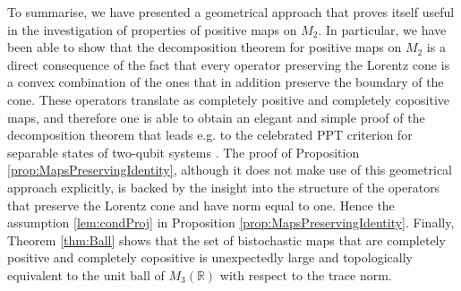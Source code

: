 \documentclass[12pt]{article}
\theoremstyle{plain}
\theoremstyle{definition}
\theoremstyle{remark}
\numberwithin{equation}{section}
\begin{document}
To summarise, we have presented a geometrical approach that proves itself useful
in the investigation of properties of positive maps on $M_{2}$.
In particular, we have been able to show that the decomposition theorem for
positive maps on $M_{2}$ is a direct consequence of the fact that every operator
preserving the Lorentz cone is a convex combination of the ones that
in addition preserve the boundary of the cone.
These operators translate as completely positive and completely copositive maps,
and therefore one is able to obtain an elegant and simple proof of the decomposition
theorem that leads e.g. to the celebrated PPT criterion for separable states
of two-qubit systems \cite{peres1996separability,horodecki1996separability}.
The proof of Proposition \ref{prop:MapsPreservingIdentity},
although it does not make use of this geometrical approach explicitly,
is backed by the insight into the structure of the operators that preserve the
Lorentz cone and have norm equal to one.
Hence the assumption \ref{lem:condProj} in Proposition \ref{prop:MapsPreservingIdentity}.
Finally, Theorem \ref{thm:Ball} shows that the set of 
bistochastic maps that are completely positive and completely copositive
is unexpectedly large and topologically equivalent to the unit ball
of $M_{3}(\mathbb{R})$ with respect to the trace norm.





\end{document}
